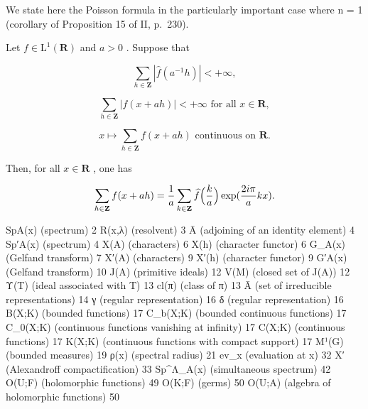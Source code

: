 
We state here the Poisson formula in the particularly important case where n = 1 (corollary of Proposition 15 of II, p.~230).

Let \(f\in \mathrm{L}^1 (\mathbf{R})\) and \(a > 0\) . Suppose that

\[
\sum_ {h \in \mathbf {Z}} | \widehat {f} (a ^ {- 1} h) | <   + \infty ,
\]

\[
\sum_ {h \in \mathbf {Z}} | f (x + a h) | <   + \infty \text {   for all   } x \in \mathbf {R},
\]

\[
x \mapsto \sum_ {h \in \mathbf {Z}} f (x + a h) \text {   continuous   on   } \mathbf {R}.
\]

Then, for all \(x \in \mathbf{R}\) , one has

\[
\sum_ {h \in {\bf Z}} f (x + a h) = \frac {1}{a} \sum_ {k \in {\bf Z}} \widehat {f} \Bigl (\frac {k}{a} \Bigr) \exp (\frac {2 i \pi}{a} k x).
\]


SpA(x) (spectrum) 2 R(x,λ) (resolvent) 3 Ā (adjoining of an identity element) 4 Sp′A(x) (spectrum) 4 X(A) (characters) 6 X(h) (character functor) 6 G\_A(x) (Gelfand transform) 7 X′(A) (characters) 9 X′(h) (character functor) 9 G′A(x) (Gelfand transform) 10 J(A) (primitive ideals) 12 V(M) (closed set of J(A)) 12 Υ(T) (ideal associated with T) 13 cl(π) (class of π) 13 Ā (set of irreducible representations) 14 γ (regular representation) 16 δ (regular representation) 16 B(X;K) (bounded functions) 17 C\_b(X;K) (bounded continuous functions) 17 C\_0(X;K) (continuous functions vanishing at infinity) 17 C(X;K) (continuous functions) 17 K(X;K) (continuous functions with compact support) 17 M¹(G) (bounded measures) 19 ρ(x) (spectral radius) 21 ev\_x (evaluation at x) 32 X′ (Alexandroff compactification) 33 Sp\^{}Λ\_A(x) (simultaneous spectrum) 42 O(U;F) (holomorphic functions) 49 O(K;F) (germs) 50 O(U;A) (algebra of holomorphic functions) 50



